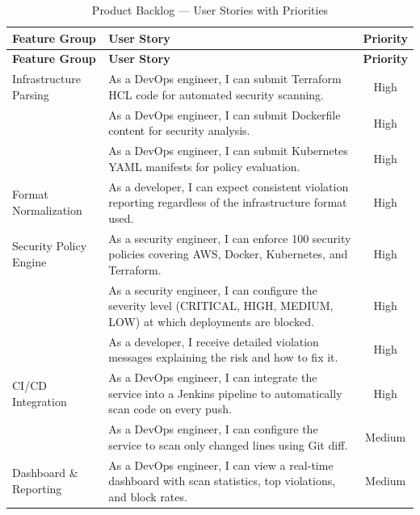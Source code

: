 \begin{longtable}{|p{3.5cm}|p{7cm}|c|}
\caption{Product Backlog — User Stories with Priorities} \label{tab:backlog} \\
\hline
\textbf{Feature Group} & \textbf{User Story} & \textbf{Priority} \\
\hline
\endfirsthead
\hline
\textbf{Feature Group} & \textbf{User Story} & \textbf{Priority} \\
\hline
\endhead
\hline
\endfoot

Infrastructure Parsing
& As a DevOps engineer, I can submit Terraform HCL code for automated security scanning.
& High \\
\hline

& As a DevOps engineer, I can submit Dockerfile content for security analysis.
& High \\
\hline

& As a DevOps engineer, I can submit Kubernetes YAML manifests for policy evaluation.
& High \\
\hline

Format Normalization
& As a developer, I can expect consistent violation reporting regardless of the infrastructure format used.
& High \\
\hline

Security Policy Engine
& As a security engineer, I can enforce 100 security policies covering AWS, Docker, Kubernetes, and Terraform.
& High \\
\hline

& As a security engineer, I can configure the severity level (CRITICAL, HIGH, MEDIUM, LOW) at which deployments are blocked.
& High \\
\hline

& As a developer, I receive detailed violation messages explaining the risk and how to fix it.
& High \\
\hline

CI/CD Integration
& As a DevOps engineer, I can integrate the service into a Jenkins pipeline to automatically scan code on every push.
& High \\
\hline

& As a DevOps engineer, I can configure the service to scan only changed lines using Git diff.
& Medium \\
\hline

Dashboard \& Reporting
& As a DevOps engineer, I can view a real-time dashboard with scan statistics, top violations, and block rates.
& Medium \\
\hline


\end{longtable}

